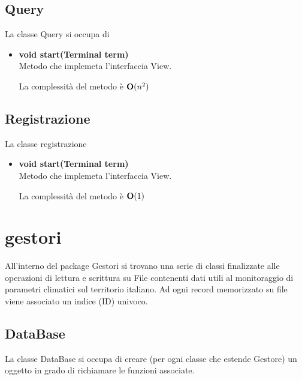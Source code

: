 \documentclass[a4paper, 12pt]{scrreprt}
\begin{document}
			\subsection{Query}
			La classe Query si occupa di 
			\begin{itemize}
				\item \textbf{void start(Terminal term)}
				\\Metodo che implemeta l'interfaccia View.
				
				La complessit\`a del metodo è $\mathbf{O}(n^2)$
				
			\end{itemize}
			\subsection{Registrazione}
			La classe registrazione
			\begin{itemize}
				\item \textbf{void start(Terminal term)}
				\\Metodo che implemeta l'interfaccia View.
				
				La complessit\`a del metodo è $\mathbf{O}(1)$
				
			\end{itemize}
			
		\section{gestori}
		All'interno del package Gestori si trovano una serie di classi finalizzate alle operazioni di lettura e scrittura su File contenenti dati utili al monitoraggio di parametri climatici sul territorio italiano.
		Ad ogni record memorizzato su file viene associato un indice (ID) univoco.
			\subsection{DataBase}
			La classe DataBase si occupa di creare (per ogni classe che estende Gestore) un oggetto in grado di richiamare le funzioni associate.
\end{document}
